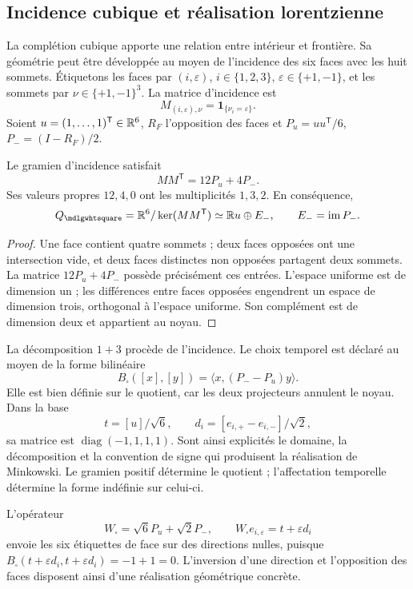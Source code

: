 \subsection{Incidence cubique et réalisation lorentzienne}

La complétion cubique apporte une relation entre intérieur et frontière.
Sa géométrie peut être développée au moyen de l'incidence des six faces
avec les huit sommets. Étiquetons les faces par \((i,\varepsilon)\),
\(i\in\{1,2,3\}\), \(\varepsilon\in\{+1,-1\}\), et les sommets par
\(\nu\in\{+1,-1\}^3\). La matrice d'incidence est
\[
 M_{(i,\varepsilon),\nu}=\mathbf1_{\{\nu_i=\varepsilon\}}.
\]
Soient \(u=(1,\ldots,1)^{\mathsf T}\in\mathbb R^6\), \(R_F\) l'opposition des faces et \(P_u=uu^{\mathsf T}/6\), \(P_-=(I-R_F)/2\).

\begin{proposition}
Le gramien d'incidence satisfait
\[
 MM^{\mathsf T}=12P_u+4P_-.
\]
Ses valeurs propres \(12,4,0\) ont les multiplicités \(1,3,2\).
En conséquence,
\[
 Q_\square=\RR^6/\ker(MM^{\mathsf T})
 \simeq\RR u\oplus E_-,\qquad E_-=\operatorname{im}P_-.
\]
\end{proposition}
\begin{proof}
Une face contient quatre sommets ; deux faces opposées ont une intersection vide, et deux faces distinctes non opposées partagent deux sommets. La matrice \(12P_u+4P_-\) possède précisément ces entrées. L'espace uniforme est de dimension un ; les différences entre faces opposées engendrent un espace de dimension trois, orthogonal à l'espace uniforme. Son complément est de dimension deux et appartient au noyau.
\end{proof}

La décomposition \(1+3\) procède de l'incidence. Le choix temporel
est déclaré au moyen de la forme bilinéaire
\[
 B_\square([x],[y])=\langle x,(P_--P_u)y\rangle.
\]
Elle est bien définie sur le quotient, car les deux projecteurs annulent le
noyau. Dans la base
\[
 t=[u]/\sqrt6,\qquad
 d_i=[e_{i,+}-e_{i,-}]/\sqrt2,
\]
sa matrice est \(\operatorname{diag}(-1,1,1,1)\). Sont ainsi explicités
le domaine, la décomposition et la convention de signe qui produisent
la réalisation de Minkowski. Le gramien positif détermine le quotient ;
l'affectation temporelle détermine la forme indéfinie sur celui-ci.

L'opérateur
\[
 W_\square=\sqrt6P_u+\sqrt2P_-,\qquad
 W_\square e_{i,\varepsilon}=t+\varepsilon d_i
\]
envoie les six étiquettes de face sur des directions nulles, puisque
\(B_\square(t+\varepsilon d_i,t+\varepsilon d_i)=-1+1=0\).
L'inversion d'une direction et l'opposition des faces disposent ainsi
d'une réalisation géométrique concrète.

